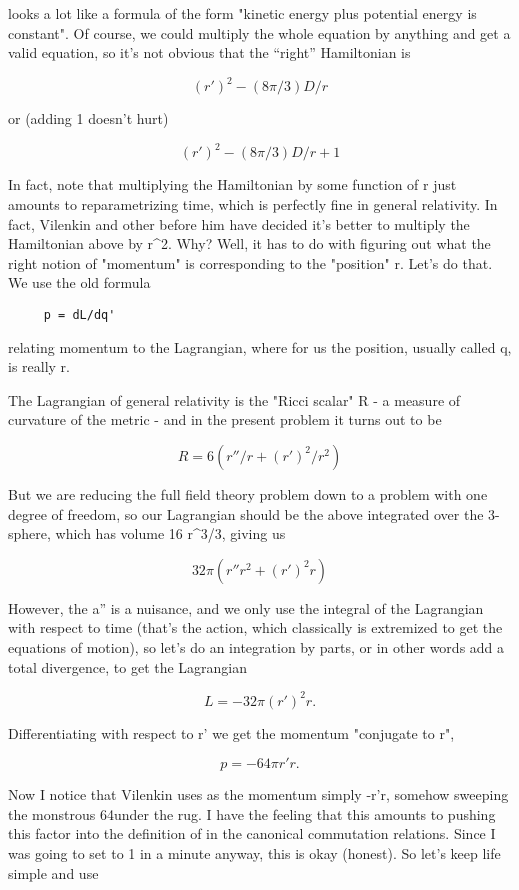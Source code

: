 looks a lot like a formula of the form "kinetic energy plus potential
energy is constant".   Of course, we could multiply the whole equation
by anything and get a valid equation, so it's not obvious that the 
``right'' Hamiltonian is

$$
  (r')^{2} - (8\pi /3) D/r
$$
    

or (adding 1 doesn't hurt)

$$
  (r')^{2} - (8\pi /3) D/r + 1
$$
    

In fact, note that multiplying the Hamiltonian by some function of r
just amounts to reparametrizing time, which is perfectly fine in general
relativity.  In fact, Vilenkin and other before him have decided it's
better to multiply the Hamiltonian above by r^{2}.   Why?  Well, it has to
do with figuring out what the right notion of "momentum" is
corresponding to the "position" r.   Let's do that.  We use the old
formula

\begin{verbatim}
     p = dL/dq'
\end{verbatim}
    

relating momentum to the Lagrangian, where for us the position, usually
called q, is really r.

The Lagrangian of general relativity is the "Ricci scalar" R - a measure of
curvature of the metric - and in the present problem it turns out to be

$$
   R = 6 (r''/r + (r')^{2}/r^{2})
$$
    

But we are reducing the full field theory problem down to a problem with
one degree of freedom, so our Lagrangian should be the above integrated
over the 3-sphere, which has volume 16 \pi  r^{3}/3, giving us

$$
   32\pi  (r'' r^{2} + (r')^{2} r)
$$
    

However, the a'' is a nuisance, and we only use the integral of the
Lagrangian with respect to time (that's the action, which classically is
extremized to get the equations of motion), so let's do an integration
by parts, or in other words add a total divergence, to get the Lagrangian

$$
   L = -32\pi  (r')^{2} r.
$$
    

Differentiating with respect to r' we get the momentum "conjugate to r",

$$
   p = -64\pi  r'r.
$$
    

Now I notice that Vilenkin uses as the momentum simply -r'r, somehow
sweeping the monstrous 64\pi  under the rug.  I have the feeling that
this amounts to pushing this factor into the definition of \hbar  in the
canonical commutation relations.  Since I was going to set \hbar  to 1 in
a minute anyway, this is okay (honest).  So let's keep life simple and
use 

